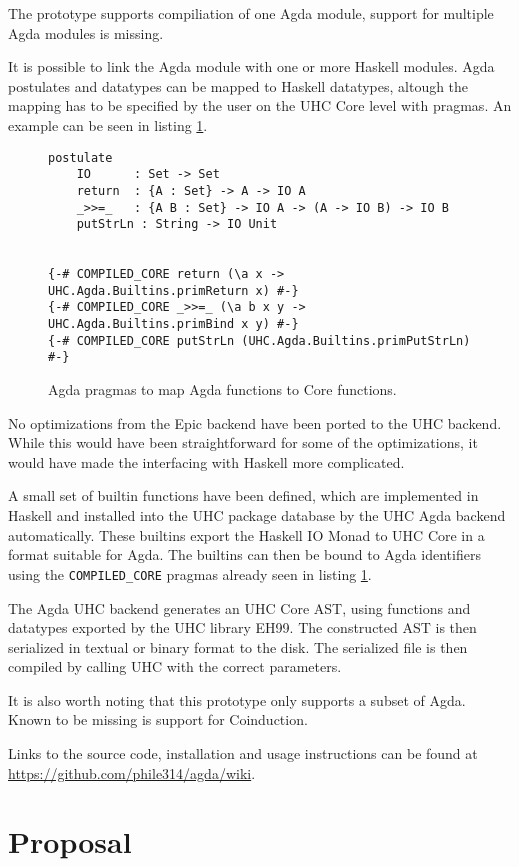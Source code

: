 \documentclass[12pt, a4paper, twoside]{report}
\begin{document}
The prototype supports compiliation of one Agda module, support for multiple Agda modules is missing.

It is possible to link the Agda module with one or more Haskell modules. Agda postulates
and datatypes can be mapped to Haskell datatypes, altough the mapping has to be specified
by the user on the UHC Core level with pragmas. An example can be seen in listing \ref{lst:agda-hs-pragmas}.
\begin{figure}
\begin{lstlisting}
postulate
    IO      : Set -> Set
    return  : {A : Set} -> A -> IO A
    _>>=_   : {A B : Set} -> IO A -> (A -> IO B) -> IO B
    putStrLn : String -> IO Unit


{-# COMPILED_CORE return (\a x -> UHC.Agda.Builtins.primReturn x) #-}
{-# COMPILED_CORE _>>=_ (\a b x y -> UHC.Agda.Builtins.primBind x y) #-}
{-# COMPILED_CORE putStrLn (UHC.Agda.Builtins.primPutStrLn) #-}
\end{lstlisting}
\caption{Agda pragmas to map Agda functions to Core functions.}
\label{lst:agda-hs-pragmas}
\end{figure}

No optimizations from the Epic backend have been ported to the UHC backend. While this
would have been straightforward for some of the optimizations, it would have made the
interfacing with Haskell more complicated.

A small set of builtin functions have been defined, which are implemented in Haskell
and installed into the UHC package database by the UHC Agda backend automatically. These
builtins export the Haskell IO Monad to UHC Core in a format suitable for Agda.
The builtins can then be bound to Agda identifiers using the \texttt{COMPILED_CORE} pragmas
already seen in listing \ref{lst:agda-hs-pragmas}.

The Agda UHC backend generates an UHC Core AST, using functions and datatypes exported
by the UHC library EH99. The constructed AST is then serialized in textual or binary format
to the disk. The serialized file is then compiled by calling UHC with the correct parameters.

It is also worth noting that this prototype only supports a subset of Agda. Known to be
missing is support for Coinduction.

Links to the source code, installation and usage instructions can be found
at \url{https://github.com/phile314/agda/wiki}.

\chapter{Proposal}
\label{chp:proposal}
\end{document}
